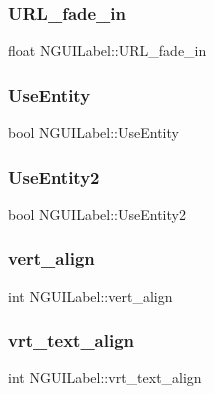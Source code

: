 \subsubsection{\texorpdfstring{U\+R\+L\+\_\+fade\+\_\+in}{URL\_fade\_in}}
{\footnotesize\ttfamily float N\+G\+U\+I\+Label\+::\+U\+R\+L\+\_\+fade\+\_\+in}

\hypertarget{class_n_g_u_i_label_a1c8db06a5e4df9ab3d6e392b252fa5bb}{}\label{class_n_g_u_i_label_a1c8db06a5e4df9ab3d6e392b252fa5bb} 
\subsubsection{\texorpdfstring{Use\+Entity}{UseEntity}}
{\footnotesize\ttfamily bool N\+G\+U\+I\+Label\+::\+Use\+Entity}

\hypertarget{class_n_g_u_i_label_aeef7803b53c0b0675210ada18c47dc0c}{}\label{class_n_g_u_i_label_aeef7803b53c0b0675210ada18c47dc0c} 
\subsubsection{\texorpdfstring{Use\+Entity2}{UseEntity2}}
{\footnotesize\ttfamily bool N\+G\+U\+I\+Label\+::\+Use\+Entity2}

\hypertarget{class_n_g_u_i_label_a5d10f048085e2fe8b63345136def6260}{}\label{class_n_g_u_i_label_a5d10f048085e2fe8b63345136def6260} 
\subsubsection{\texorpdfstring{vert\+\_\+align}{vert\_align}}
{\footnotesize\ttfamily int N\+G\+U\+I\+Label\+::vert\+\_\+align}

\hypertarget{class_n_g_u_i_label_abdd1c5556c3816f6ef8b0a2ff20b1811}{}\label{class_n_g_u_i_label_abdd1c5556c3816f6ef8b0a2ff20b1811} 
\subsubsection{\texorpdfstring{vrt\+\_\+text\+\_\+align}{vrt\_text\_align}}
{\footnotesize\ttfamily int N\+G\+U\+I\+Label\+::vrt\+\_\+text\+\_\+align}

